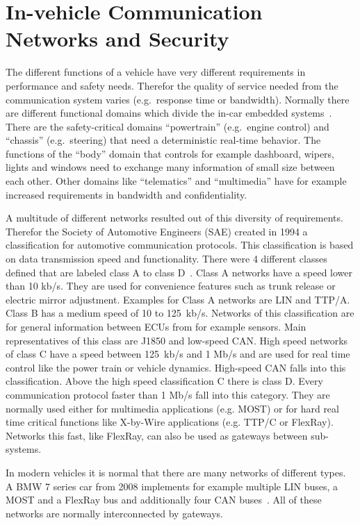 

\section{In-vehicle Communication Networks and Security}\label{sec:communication-networks}

The different functions of a vehicle have very different requirements in
performance and safety needs. Therefor the quality of service needed from the
communication system varies (e.g.\ response time or bandwidth). Normally there
are different functional domains which divide the in-car embedded
systems~\cite{Navet2017}. There are the safety-critical domains ``powertrain''
(e.g.\ engine control) and ``chassis'' (e.g.\ steering) that need a deterministic
real-time behavior. The functions of the ``body'' domain that controls for
example dashboard, wipers, lights and windows need to exchange many information
of small size between each other. Other domains like ``telematics'' and
``multimedia'' have for example increased requirements in bandwidth and
confidentiality.

A multitude of different networks resulted out of this diversity of
requirements. Therefor the Society of Automotive Engineers (SAE) created in 1994
a classification for automotive communication protocols. This classification is
based on data transmission speed and functionality. There were 4 different
classes defined that are labeled class A to class D~\cite{Ali2017}. Class A
networks have a speed lower than 10 kb/s. They are used for convenience features
such as trunk release or electric mirror adjustment. Examples for Class A
networks are LIN and TTP/A. Class B has a medium speed of 10 to 125~kb/s.
Networks of this classification are for general information between ECUs from
for example sensors. Main representatives of this class are J1850 and low-speed
CAN\@. High speed networks of class C have a speed between 125~kb/s and 1 Mb/s and
are used for real time control like the power train or vehicle dynamics.
High-speed CAN falls into this classification. Above the high speed
classification C there is class D\@. Every communication protocol faster than 1
Mb/s fall into this category. They are normally used either for multimedia
applications (e.g. MOST) or for hard real time critical functions like X-by-Wire
applications (e.g. TTP/C or FlexRay). Networks this fast, like FlexRay, can also
be used as gateways between sub-systems.

In modern vehicles it is normal that there are many networks of different types.
A BMW 7 series car from 2008 implements for example multiple LIN buses, a MOST
and a FlexRay bus and additionally four CAN buses~\cite{Kellermann2008}. All of
these networks are normally interconnected by gateways.

